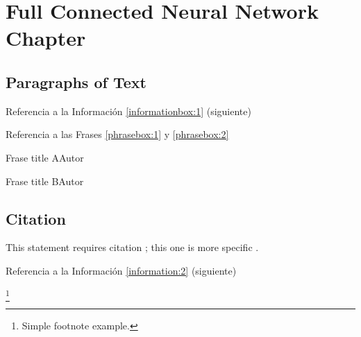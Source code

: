 \chapter{Full Connected Neural Network Chapter}

\section{Paragraphs of Text}

\lipsum[1][1-3] 

Referencia a la Información \ref{informationbox:1} (siguiente)

\begin{informationbox}[Título A]
\label{informationbox:1}
\lipsum[1][1-3] 
\end{informationbox}

\lipsum[1][1-3]


Referencia a las Frases \ref{phrasebox:1} y \ref{phrasebox:2} 

\begin{phrasebox}{Frase title A}{Autor}
\label{phrasebox:1}
\lipsum[1][1-3] 
\end{phrasebox}

\lipsum[1] 

\begin{phrasebox}{Frase title B}{Autor}
\label{phrasebox:2}
\lipsum[1][1-3] 
\end{phrasebox}

\lipsum[1][1-3] 

\begin{citationbox}
\lipsum[1][1-3] 
\end{citationbox}

\section{Citation}

This statement requires citation \cite{book_key}; this one is more specific \cite[122]{article_key}.

\lipsum[1] %

Referencia a la Información \ref{information:2} (siguiente)

\begin{informationbox}[Título B]
\label{information:2}
\lipsum[1][1-3]\footnote{Simple footnote example.}
\end{informationbox}

